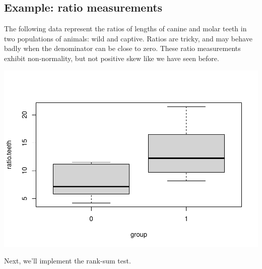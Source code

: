 \documentclass[
]{book}
\begin{document}
\hypertarget{example-ratio-measurements}{%
\subsection{Example: ratio measurements}\label{example-ratio-measurements}}

The following data represent the ratios of lengths of canine and molar teeth in two populations of animals: wild and captive. Ratios are tricky, and may behave badly when the denominator can be close to zero. These ratio measurements exhibit non-normality, but not positive skew like we have seen before.

\includegraphics{04-Non-Normal-Responses_files/figure-latex/unnamed-chunk-7-1.pdf}

Next, we'll implement the rank-sum test.
\end{document}
